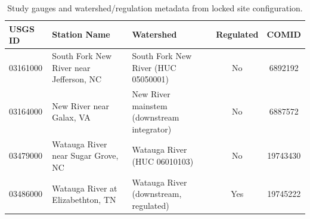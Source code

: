 \begin{table}
\centering
\caption{Study gauges and watershed/regulation metadata from locked site configuration.}
\small
\begin{tabular}{lllcc}
\toprule
\textbf{USGS ID} & \textbf{Station Name} & \textbf{Watershed} & \textbf{Regulated} & \textbf{COMID} \\
\midrule
03161000 & South Fork New River near Jefferson, NC & South Fork New River (HUC 05050001) & No & 6892192 \\
03164000 & New River near Galax, VA & New River mainstem (downstream integrator) & No & 6887572 \\
03479000 & Watauga River near Sugar Grove, NC & Watauga River (HUC 06010103) & No & 19743430 \\
03486000 & Watauga River at Elizabethton, TN & Watauga River (downstream, regulated) & Yes & 19745222 \\
\bottomrule
\end{tabular}
\label{tab:sites}
\end{table}
